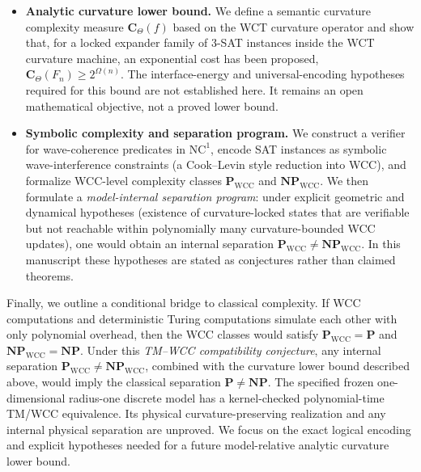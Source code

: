 \documentclass[12pt]{article}
\theoremstyle{remark}
\begin{document}
\begin{itemize}
  \item \textbf{Analytic curvature lower bound.}
        We define a semantic curvature complexity measure $\mathbf{C}_\Theta(f)$
        based on the WCT curvature operator and show that, for a locked
        expander family of 3-SAT instances inside the WCT curvature machine,
        an exponential cost has been proposed,
        $\mathbf{C}_\Theta(F_n) \ge 2^{\Omega(n)}$.
        The interface-energy and universal-encoding hypotheses required
        for this bound are not established here. It remains an open
        mathematical objective, not a proved lower bound.

  \item \textbf{Symbolic complexity and separation program.}
        We construct a verifier for wave-coherence predicates in $\mathrm{NC}^1$,
        encode SAT instances as symbolic wave-interference constraints
        (a Cook--Levin style reduction into WCC), and formalize WCC-level
        complexity classes $\mathbf{P}_{\mathrm{WCC}}$ and $\mathbf{NP}_{\mathrm{WCC}}$.
        We then formulate a \emph{model-internal separation program}:
        under explicit geometric and dynamical hypotheses (existence of
        curvature-locked states that are verifiable but not reachable within
        polynomially many curvature-bounded WCC updates), one would obtain an
        internal separation
        $\mathbf{P}_{\mathrm{WCC}} \neq \mathbf{NP}_{\mathrm{WCC}}$.
        In this manuscript these hypotheses are stated as conjectures rather
        than claimed theorems.
\end{itemize}

Finally, we outline a conditional bridge to classical complexity.
If WCC computations and deterministic Turing computations simulate each
other with only polynomial overhead, then the WCC classes would satisfy
$\mathbf{P}_{\mathrm{WCC}} = \mathbf{P}$ and $\mathbf{NP}_{\mathrm{WCC}} = \mathbf{NP}$.
Under this \emph{TM--WCC compatibility conjecture}, any internal separation
$\mathbf{P}_{\mathrm{WCC}} \neq \mathbf{NP}_{\mathrm{WCC}}$, combined with the curvature
lower bound described above, would imply the classical separation
$\mathbf{P} \neq \mathbf{NP}$.
The specified frozen one-dimensional radius-one discrete model has a
kernel-checked polynomial-time TM/WCC equivalence. Its physical
curvature-preserving realization and any internal physical separation are
unproved. We focus on the exact logical encoding and explicit hypotheses
needed for a future model-relative analytic curvature lower bound.
\end{document}
